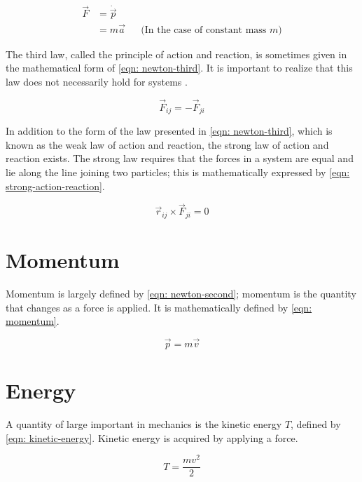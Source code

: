 \documentclass[main.tex]{subfiles}
\begin{document}
\begin{align} \label{eqn: newton-second}
\vec{F} &= \dot{\vec{p}}  && \\
&= m \vec{a} &&\text{(In the case of constant mass $m$)}
\end{align}

The third law, called the principle of action and reaction, is sometimes given in the
mathematical form of \cref{eqn: newton-third}. It is important to realize that this
law does not necessarily hold for systems \cite{goldstein_cm}.

\begin{equation} \label{eqn: newton-third}
\vec{F}_{ij} = -\vec{F}_{ji}
\end{equation}

In addition to the form of the law presented in \cref{eqn: newton-third}, which is known
as the weak law of action and reaction, the strong law of action and reaction exists. The
strong law requires that the forces in a system are equal and lie along the line joining
two particles; this is mathematically expressed by \cref{eqn: strong-action-reaction}.

\begin{equation} \label{eqn: strong-action-reaction}
\vec{r}_{ij} \times \vec{F}_{ji} = 0
\end{equation}

\section{Momentum}

Momentum is largely defined by \cref{eqn: newton-second}; momentum is the quantity
that changes as a force is applied. It is mathematically defined by \cref{eqn: momentum}.

\begin{equation} \label{eqn: momentum}
\vec{p} = m \vec{v}
\end{equation}

\section{Energy}

A quantity of large important in mechanics is the kinetic energy $T$, defined by
\cref{eqn: kinetic-energy}. Kinetic energy is acquired by applying a force.

\begin{equation} \label{eqn: kinetic-energy}
T = \frac{m v^2}{2}
\end{equation}
\end{document}
